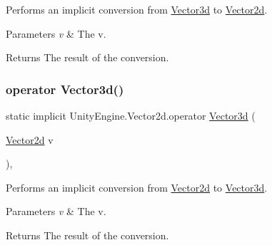 Performs an implicit conversion from \hyperlink{struct_unity_engine_1_1_vector3d}{Vector3d} to \hyperlink{struct_unity_engine_1_1_vector2d}{Vector2d}. 


\begin{DoxyParams}{Parameters}
{\em v} & The v.\\
\hline
\end{DoxyParams}
\begin{DoxyReturn}{Returns}
The result of the conversion.
\end{DoxyReturn}
\mbox{\label{struct_unity_engine_1_1_vector2d_ad814c24e4e18473237b7f20701b2050b}} 
\subsubsection{\texorpdfstring{operator Vector3d()}{operator Vector3d()}}
{\footnotesize\ttfamily static implicit Unity\+Engine.\+Vector2d.\+operator \hyperlink{struct_unity_engine_1_1_vector3d}{Vector3d} (\begin{DoxyParamCaption}\item[{\hyperlink{struct_unity_engine_1_1_vector2d}{Vector2d}}]{v }\end{DoxyParamCaption})\hspace{0.3cm}{\ttfamily [inline]}, {\ttfamily [static]}}



Performs an implicit conversion from \hyperlink{struct_unity_engine_1_1_vector2d}{Vector2d} to \hyperlink{struct_unity_engine_1_1_vector3d}{Vector3d}. 


\begin{DoxyParams}{Parameters}
{\em v} & The v.\\
\hline
\end{DoxyParams}
\begin{DoxyReturn}{Returns}
The result of the conversion.
\end{DoxyReturn}
\mbox{\label{struct_unity_engine_1_1_vector2d_a6e8cd4a21aadcdbdcf68465a7b3a6b07}} 
